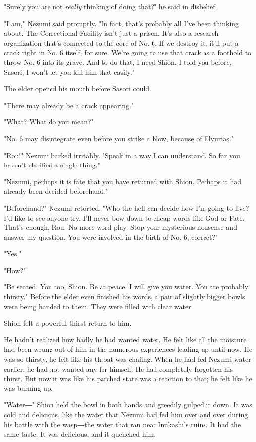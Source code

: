 "Surely you are not \emph{really} thinking of doing that?" he said in
disbelief.

"I am," Nezumi said promptly. "In fact, that's probably all I've been
thinking about. The Correctional Facility isn't just a prison. It's also
a research organization that's connected to the core of No. 6. If we
destroy it, it'll put a crack right in No. 6 itself, for sure. We're
going to use that crack as a foothold to throw No. 6 into its grave. And
to do that, I need Shion. I told you before, Sasori, I won't let you
kill him that easily."

The elder opened his mouth before Sasori could.

"There may already be a crack appearing."

"What? What do you mean?"

"No. 6 may disintegrate even before you strike a blow, because of
Elyurias."

"Rou!" Nezumi barked irritably. "Speak in a way I can understand. So far
you haven't clarified a single thing."

"Nezumi, perhaps it is fate that you have returned with Shion. Perhaps
it had already been decided beforehand."

"Beforehand?" Nezumi retorted. "Who the hell can decide how I'm going to
live? I'd like to see anyone try. I'll never bow down to cheap words
like God or Fate. That's enough, Rou. No more word-play. Stop your
mysterious nonsense and answer my question. You were involved in the
birth of No. 6, correct?"

"Yes."

"How?"

"Be seated. You too, Shion. Be at peace. I will give you water. You are
probably thirsty." Before the elder even finished his words, a pair of
slightly bigger bowls were being handed to them. They were filled with
clear water.

Shion felt a powerful thirst return to him.

He hadn't realized how badly he had wanted water. He felt like all the
moisture had been wrung out of him in the numerous experiences leading
up until now. He was so thirsty, he felt like his throat was chafing.
When he had fed Nezumi water earlier, he had not wanted any for himself.
He had completely forgotten his thirst. But now it was like his parched
state was a reaction to that; he felt like he was burning up.

"Water―" Shion held the bowl in both hands and greedily gulped it down.
It was cold and delicious, like the water that Nezumi had fed him over
and over during his battle with the wasp―the water that ran near
Inukashi's ruins. It had the same taste. It was delicious, and it
quenched him.

